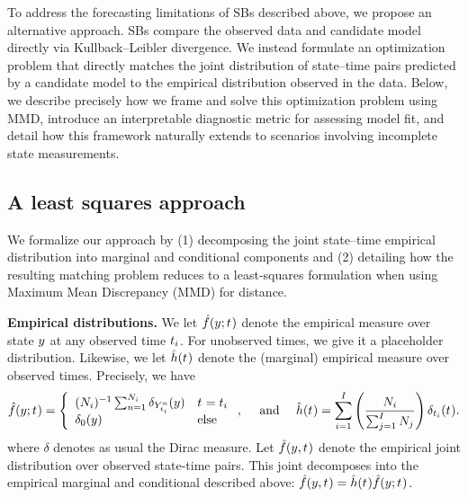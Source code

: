 

To address the forecasting limitations of SBs described above, we propose an alternative approach.
SBs compare the observed data and candidate model directly via Kullback–Leibler divergence.
We instead formulate an optimization problem that directly matches the joint distribution of state–time pairs predicted by a candidate model to the empirical distribution observed in the data. Below, we describe precisely how we frame and solve this optimization problem using MMD, introduce an interpretable diagnostic metric for assessing model fit, and detail how this framework naturally extends to scenarios involving incomplete state measurements.

\subsection{A least squares approach}
We formalize our approach by (1) decomposing the joint state--time empirical distribution into marginal and conditional components and (2) detailing how the resulting matching problem  reduces to a least-squares formulation when using Maximum Mean Discrepancy (MMD) for distance.

\textbf{Empirical distributions.}
We let $\empconditional{\statevar}{\timestep{}}$ denote the empirical measure over state $\statevar$ at any observed time $t_{i}$. For unobserved times, we give it a placeholder distribution. Likewise, we let $\hat{h}(t_{})$ denote the (marginal) empirical measure over observed times. Precisely, we have
\begin{equation}
    \label{eq:empirical_dists}
\empconditional{\statevar}{\timestep{}} = \left\{ \begin{array}{ll} (\tottrajec_{\timeidx})^{-1} \sum_{\sampleidx=1}^{\tottrajec_{\timeidx}} \delta_{\obsat{\timet_{\timeidx}}^{\sampleidx}}(\statevar) & \timestep{} = \timestep{\timeidx} \\
    \delta_{\bm{0}}(\statevar) & \textrm{else}
    \end{array}
    \right.,
    \quad \textrm{ and } \quad
        \emptimemeasure(\timestep{}) = \sum_{\timeidx=1}^{\totsteps} \left(\frac{\tottrajec_{\timeidx}}{\sum_{j=1}^{\totsteps} \tottrajec_{j}}\right) \delta_{\timestep{\timeidx}}(\timestep{}). 
\end{equation}
where $\delta$ denotes as usual the Dirac measure. Let $\empjoint{\statevar}{\timestep{}}$ denote the empirical joint distribution over observed state-time pairs. This joint decomposes into the empirical marginal and conditional described above: $\empjoint{\statevar}{\timestep{}} = \emptimemeasure(\timestep{}) \empconditional{\statevar}{\timestep{}}$.


